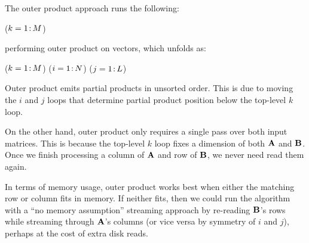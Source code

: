 The outer product approach runs the following:

\removelatexerror
\begin{algorithm}[H]
\vspace{\algspace}
\fore($k = 1\colon\! M$){
}
\vspace{\algspace}
\end{algorithm}

\noindent %
performing outer %
product on vectors, 
which unfolds as:

\removelatexerror
\begin{algorithm}[H]
\vspace{\algspace}
\fore($k = 1\colon\! M$){
\fore($i = 1\colon\! N$){
\fore($j = 1\colon\! L$){
}}}
\vspace{\algspace}
\end{algorithm}

Outer product emits partial products in unsorted order.
This is due to moving the $i$ and $j$ loops
that determine partial product position
below the top-level $k$ loop.

On the other hand, outer product only requires a single pass over both input matrices.
This is because the top-level $k$ loop fixes a dimension of both $\mathbf{A}$ and $\mathbf{B}$.
Once we finish processing a column of $\mathbf{A}$ and row of $\mathbf{B}$,
we never need read them again.%

In terms of memory usage, outer product works best when either the matching row or column fits in memory.
If neither fits, then we could run the algorithm 
with a ``no memory assumption'' streaming approach
by re-reading $\mathbf{B}$'s rows while streaming through $\mathbf{A}$'s columns 
(or vice versa by symmetry of $i$ and $j$),
perhaps at the cost of extra disk reads.

